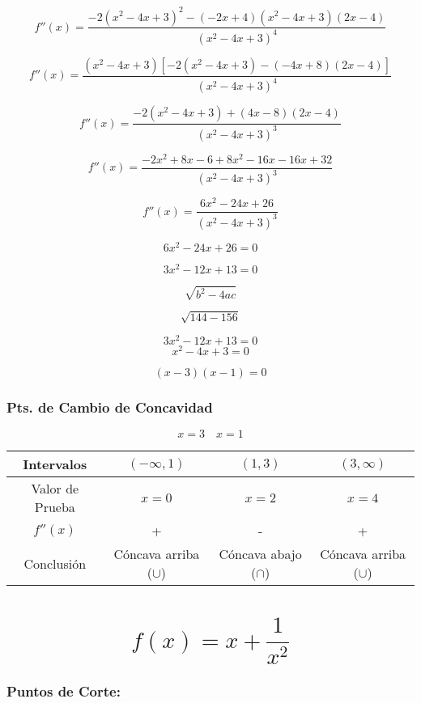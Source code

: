\[
f''(x) = \frac{-2 (x^2 - 4x + 3)^2 - (-2x + 4) (x^2 - 4x + 3) (2x - 4)}{(x^2 - 4x + 3)^4}
\]

\[
f''(x) = \frac{(x^2 - 4x + 3) \left[ -2 (x^2 - 4x + 3) - (-4x + 8) (2x - 4) \right]}{(x^2 - 4x + 3)^4}
\]

\[
f''(x) = \frac{-2 (x^2 - 4x + 3) + (4x - 8) (2x - 4)}{(x^2 - 4x + 3)^3}
\]

\[
f''(x) = \frac{-2x^2 + 8x - 6 + 8x^2 - 16x - 16x + 32}{(x^2 - 4x + 3)^3}
\]

\[
f''(x) = \frac{6x^2 - 24x + 26}{(x^2 - 4x + 3)^3}
\]

\[
6x^2 - 24x + 26 = 0
\]

\[
3x^2 - 12x + 13 = 0
\]

\[
\sqrt{b^2 - 4ac}
\]

\[
\sqrt{144 - 156}
\]

\[
3x^2 - 12x + 13 = 0
\]
\[
x^2 - 4x + 3 = 0
\]

\[
(x - 3)(x - 1) = 0
\]

\subsubsection*{Pts. de Cambio de Concavidad}

\[
x = 3 \quad x = 1
\]

\begin{center}
    \begin{tabular}{|c|c|c|c|}
        \hline
        Intervalos & $(-\infty,1)$ & $(1,3)$ & $(3,\infty)$ \\
        \hline
        Valor de Prueba & $x=0$ & $x=2$ & $x=4$ \\
        \hline
        $f''(x)$ & + & - & + \\
        \hline
        Conclusión & Cóncava arriba ($\cup$) & Cóncava abajo ($\cap$) & Cóncava arriba ($\cup$) \\
        \hline
    \end{tabular}
\end{center}

\begin{figure}[H]
    \centering
    
\end{figure}


\section*{\[f(x) = x + \frac{1}{x^2}\]}

\subsubsection*{Puntos de Corte:}

